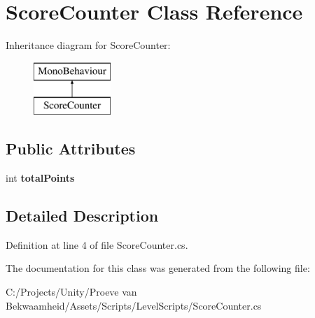 \hypertarget{class_score_counter}{\section{Score\+Counter Class Reference}
\label{class_score_counter}
}
Inheritance diagram for Score\+Counter\+:\begin{figure}[H]
\begin{center}
\leavevmode
\includegraphics[height=2.000000cm]{class_score_counter}
\end{center}
\end{figure}
\subsection*{Public Attributes}
\begin{DoxyCompactItemize}
\item 
\hypertarget{class_score_counter_a4dfb92a30d6b9f84514a10ebcf138692}{int {\bfseries total\+Points}}\label{class_score_counter_a4dfb92a30d6b9f84514a10ebcf138692}

\end{DoxyCompactItemize}


\subsection{Detailed Description}


Definition at line 4 of file Score\+Counter.\+cs.



The documentation for this class was generated from the following file\+:\begin{DoxyCompactItemize}
\item 
C\+:/\+Projects/\+Unity/\+Proeve van Bekwaamheid/\+Assets/\+Scripts/\+Level\+Scripts/Score\+Counter.\+cs\end{DoxyCompactItemize}
